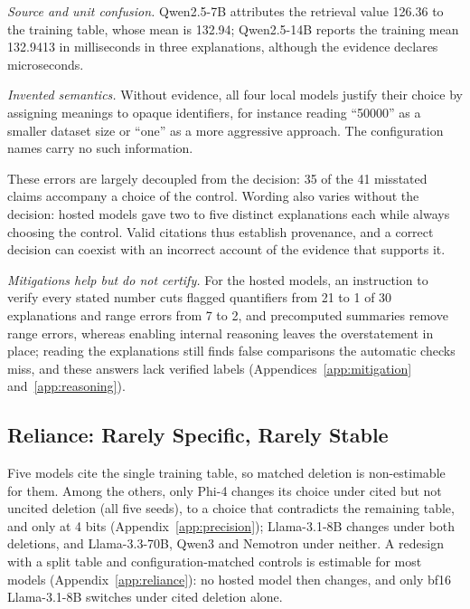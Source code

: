 \emph{Source and unit confusion.} Qwen2.5-7B attributes the retrieval value 126.36 to the training table, whose mean is 132.94; Qwen2.5-14B reports the training mean 132.9413 in milliseconds in three explanations, although the evidence declares microseconds.

\emph{Invented semantics.} Without evidence, all four local models justify their choice by assigning meanings to opaque identifiers, for instance reading ``50000'' as a smaller dataset size or ``one'' as a more aggressive approach. The configuration names carry no such information.

These errors are largely decoupled from the decision: 35 of the 41 misstated claims accompany a choice of the control. Wording also varies without the decision: hosted models gave two to five distinct explanations each while always choosing the control. Valid citations thus establish provenance, and a correct decision can coexist with an incorrect account of the evidence that supports it.

\emph{Mitigations help but do not certify.} For the hosted models, an instruction to verify every stated number cuts flagged quantifiers from 21 to 1 of 30 explanations and range errors from 7 to 2, and precomputed summaries remove range errors, whereas enabling internal reasoning leaves the overstatement in place; reading the explanations still finds false comparisons the automatic checks miss, and these answers lack verified labels (Appendices~\ref{app:mitigation} and~\ref{app:reasoning}).

\subsection{Reliance: Rarely Specific, Rarely Stable}
\label{subsec:reliance}
Five models cite the single training table, so matched deletion is non-estimable for them. Among the others, only Phi-4 changes its choice under cited but not uncited deletion (all five seeds), to a choice that contradicts the remaining table, and only at 4 bits (Appendix~\ref{app:precision}); Llama-3.1-8B changes under both deletions, and Llama-3.3-70B, Qwen3 and Nemotron under neither. A redesign with a split table and configuration-matched controls is estimable for most models (Appendix~\ref{app:reliance}): no hosted model then changes, and only bf16 Llama-3.1-8B switches under cited deletion alone.

